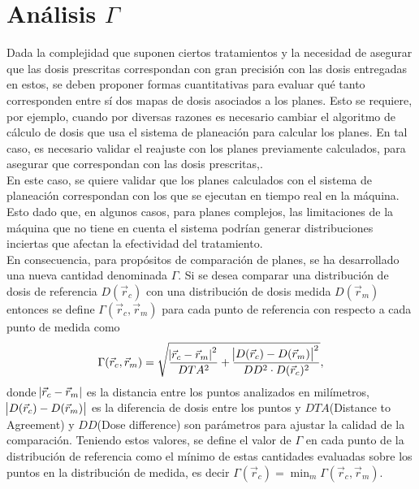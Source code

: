 \section{Análisis $\Gamma$}
Dada la complejidad que suponen ciertos tratamientos y la necesidad de asegurar que las dosis prescritas correspondan con gran precisión con las dosis entregadas en estos, se deben proponer formas cuantitativas para evaluar qué tanto corresponden entre sí dos mapas de dosis asociados a los planes. Esto se requiere, por ejemplo, cuando por diversas razones es necesario cambiar el algoritmo de cálculo de dosis que usa el sistema de planeación para calcular los planes. En tal caso, es necesario validar el reajuste con los planes previamente calculados, para asegurar que correspondan con las dosis prescritas,\cite{Winiecki2009}\cite{Li2011}.\\

En este caso, se quiere validar que los planes calculados con el sistema de planeación correspondan con los que se ejecutan en tiempo real en la máquina. Esto dado que, en algunos casos, para planes complejos, las limitaciones de la máquina que no tiene en cuenta el sistema podrían generar distribuciones inciertas que afectan la efectividad del tratamiento.\\

En consecuencia, para propósitos de comparación de planes, se ha desarrollado una nueva cantidad denominada $\Gamma$. Si se desea comparar una distribución de dosis de referencia $D(\vec{r}_{c})$ con una distribución de dosis medida $D(\vec{r}_{m})$ entonces se define $\Gamma(\vec{r}_c,\vec{r}_m)$ para cada punto de referencia con respecto a cada punto de medida como 
\begin{equation}
\label{eqn:gamma}
\Gamma(\vec{r}_c,\vec{r}_m)=\sqrt{\frac{\abs{\vec{r}_c-\vec{r}_m}^2}{DTA^2}+\frac{\abs{D(\vec{r}_c)-D(\vec{r}_m)}^2}{DD^2\cdot D(\vec{r}_c)^2}},
\end{equation}
donde $\abs{\vec{r}_c-\vec{r}_m}$ es la distancia entre los puntos analizados en milímetros, ${\abs{D(\vec{r}_c)-D(\vec{r}_m)}}$ es la diferencia de dosis entre los puntos y $DTA$(Distance to Agreement) y $DD$(Dose difference) son parámetros para ajustar la calidad de la comparación. Teniendo estos valores, se define el valor de $\Gamma$ en cada punto de la distribución de referencia como el mínimo de estas cantidades evaluadas sobre los puntos en la distribución de medida, es decir $\Gamma(\vec{r}_c)=\min_{m} \Gamma(\vec{r}_c,\vec{r}_m)$.\\

